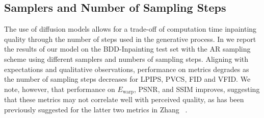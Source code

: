 \subsection{Samplers and Number of Sampling Steps}
The use of diffusion models allows for a trade-off of computation time \vs inpainting quality through the number of steps used in the generative process. In  we report the results of our model on the BDD-Inpainting test set with the AR sampling scheme using different samplers and numbers of sampling steps. Aligning with expectations and qualitative observations, performance on metrics degrades as the number of sampling steps decreases for LPIPS, PVCS, FID and VFID. We note, however, that performance on $E_\text{warp}$, PSNR, and SSIM improves, suggesting that these metrics may not correlate well with perceived quality, as has been previously suggested for the latter two metrics in Zhang \etal~\cite{perceptual}.
\begin{table}[t]
\centering
\caption{Effect of diffusion samplers, using AR sampling on BDD-Inpainting.}
\label{table:samplingsteps}
\end{table}
